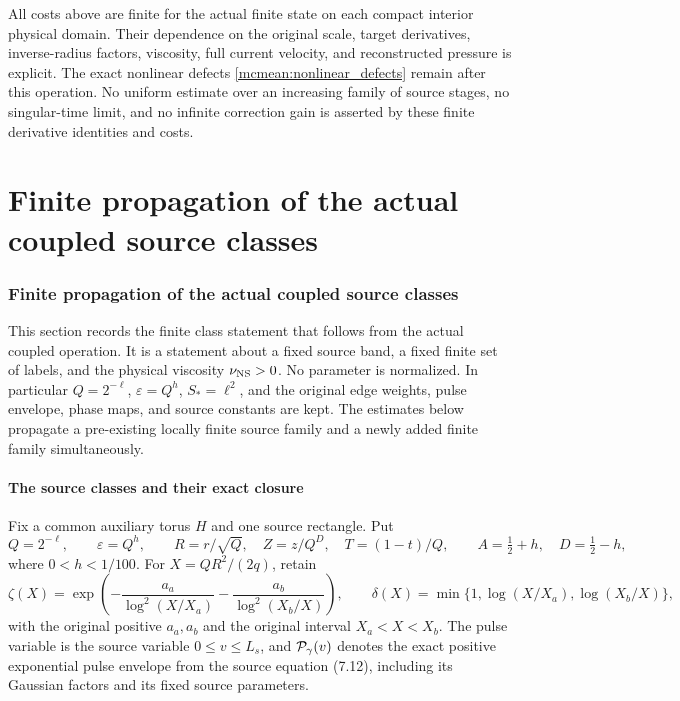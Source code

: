 \documentclass[11pt]{article}
\begin{document}
All costs above are finite for the actual finite state on each compact
interior physical domain. Their dependence on the original scale,
target derivatives, inverse-radius factors, viscosity, full current
velocity, and reconstructed pressure is explicit. The exact nonlinear
defects \eqref{mcmean:nonlinear_defects} remain after this operation.
No uniform estimate over an increasing family of source stages,
no singular-time limit, and no infinite correction gain is asserted
by these finite derivative identities and costs.


\clearpage\part{Finite propagation of the actual coupled source classes}
\section{Finite propagation of the actual coupled source classes}
\label{mccp:section}

This section records the finite class statement that follows from the
actual coupled operation. It is a statement about a fixed source band,
a fixed finite set of labels, and the physical viscosity
$\nu_{\rm NS}>0$. No parameter is normalized. In particular
$Q=2^{-\ell}$, $\varepsilon=Q^h$, $S_* = \ell^2$, and the original
edge weights, pulse envelope, phase maps, and source constants are kept.
The estimates below propagate a pre-existing locally finite source family
and a newly added finite family simultaneously.

\subsection{The source classes and their exact closure}

Fix a common auxiliary torus $H$ and one source rectangle. Put
\[
 Q=2^{-\ell},\qquad \varepsilon=Q^h,\qquad
 R=r/\sqrt Q,\quad Z=z/Q^D,\quad T=(1-t)/Q,
 \qquad A=\tfrac12+h,\quad D=\tfrac12-h,
\]
where $0<h<1/100$. For $X=QR^2/(2q)$, retain
\[
 \zeta(X)=\exp\!\left(-\frac{a_a}{\log^2(X/X_a)}
       -\frac{a_b}{\log^2(X_b/X)}\right),\qquad
 \delta(X)=\min\{1,\log(X/X_a),\log(X_b/X)\},
\]
with the original positive $a_a,a_b$ and the original interval
$X_a<X<X_b$. The pulse variable is the source variable
$0\leq v\leq L_s$, and ${\cal P}_\gamma(v)$ denotes the exact positive
exponential pulse envelope from the source equation (7.12), including
its Gaussian factors and its fixed source parameters.
\end{document}
